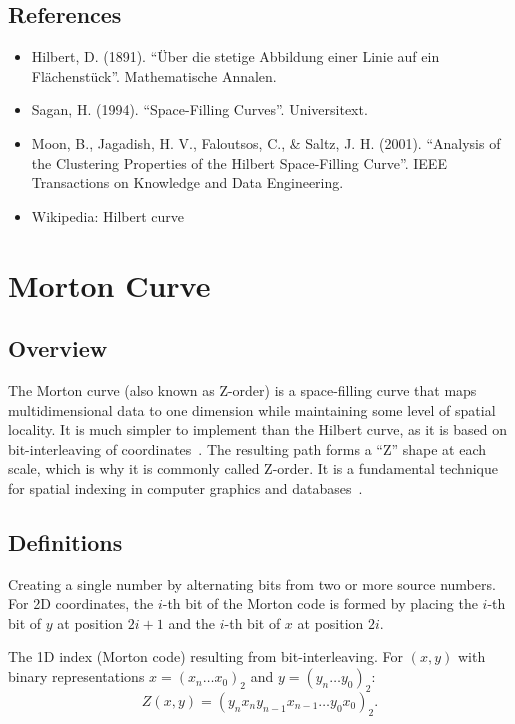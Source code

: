 \subsection{References}
\begin{itemize}
    \item Hilbert, D. (1891). ``\"Uber die stetige Abbildung einer Linie auf ein Fl\"achenst\"uck''. Mathematische Annalen.
    \item Sagan, H. (1994). ``Space-Filling Curves''. Universitext.
    \item Moon, B., Jagadish, H. V., Faloutsos, C., \& Saltz, J. H. (2001). ``Analysis of the Clustering Properties of the Hilbert Space-Filling Curve''. IEEE Transactions on Knowledge and Data Engineering.
    \item Wikipedia: Hilbert curve
\end{itemize}


\section{Morton Curve}
\label{sec:morton_curve}

\subsection{Overview}
The Morton curve (also known as Z-order) is a space-filling curve that maps multidimensional data to one dimension while maintaining some level of spatial locality. It is much simpler to implement than the Hilbert curve, as it is based on bit-interleaving of coordinates~\cite{morton1966}. The resulting path forms a ``Z'' shape at each scale, which is why it is commonly called Z-order. It is a fundamental technique for spatial indexing in computer graphics and databases~\cite{samet1984}.

\subsection{Definitions}
\begin{definition}\label{def:bit_interleaving}
Creating a single number by alternating bits from two or more source numbers. For 2D coordinates, the $i$-th bit of the Morton code is formed by placing the $i$-th bit of $y$ at position $2i+1$ and the $i$-th bit of $x$ at position $2i$.
\end{definition}

\begin{definition}\label{def:z_order_index}
The 1D index (Morton code) resulting from bit-interleaving. For $(x, y)$ with binary representations $x = (x_n \ldots x_0)_2$ and $y = (y_n \ldots y_0)_2$:
\[
Z(x, y) = (y_n x_n y_{n-1} x_{n-1} \ldots y_0 x_0)_2.
\]
\end{definition}

